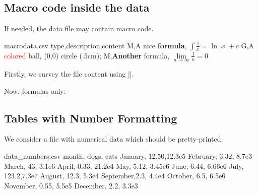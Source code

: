 \documentclass[a4paper,11pt]{ltxdoc}
\begin{document}
\clearpage
\subsection{Macro code inside the data}\label{macrocodexample}%

If needed, the data file may contain macro code.

\begin{tcbverbatimwrite}{macrodata.csv}
type,description,content
M,A nice \textbf{formula},         $\displaystyle \int\frac{1}{x} = \ln|x|+c$
G,A \textcolor{red}{colored} ball, {\tikz \shadedraw [shading=ball] (0,0) circle (.5cm);}
M,\textbf{Another} formula,        $\displaystyle \lim\limits_{n\to\infty} \frac{1}{n}=0$
\end{tcbverbatimwrite}


Firstly, we survey the file content using
|\csvautobooktabular|.

\begin{dispExample}
\end{dispExample}


\begin{dispExample}


\bigskip
Now, formulas only:
\end{dispExample}

\clearpage
\subsection{Tables with Number Formatting}\label{numberformatting}%

We consider a file with numerical data which should be pretty-printed.

\begin{tcbverbatimwrite}{data_numbers.csv}
month,    dogs, cats
January,  12.50,12.3e5
February, 3.32, 8.7e3
March,    43,   3.1e6
April,    0.33, 21.2e4
May,      5.12, 3.45e6
June,     6.44, 6.66e6
July,     123.2,7.3e7
August,   12.3, 5.3e4
September,2.3,  4.4e4
October,  6.5,  6.5e6
November, 0.55, 5.5e5
December, 2.2,  3.3e3
\end{tcbverbatimwrite}
\end{document}
